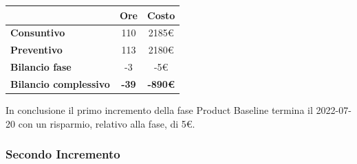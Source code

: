 \begin{center}
	\renewcommand{\arraystretch}{1.8}
	\begin{tabular}{ | l |c|c| }
    \hline
    & \textbf{Ore} & \textbf{Costo} \\
	\hline
    \textbf{Consuntivo} & 110 & 2185\euro \\
    \hline
    \textbf{Preventivo} & 113 & 2180\euro \\
    \hline
    \textbf{Bilancio fase} & -3 & -5\euro \\
    \hline
    \textbf{Bilancio complessivo} & \textbf{-39} & \textbf{-890\euro} \\
    \hline
    \end{tabular}
\end{center}
In conclusione il primo incremento della fase Product Baseline termina il 2022-07-20 con un risparmio, relativo
alla fase, di 5€.

\newpage

\subsubsection{Secondo Incremento}

